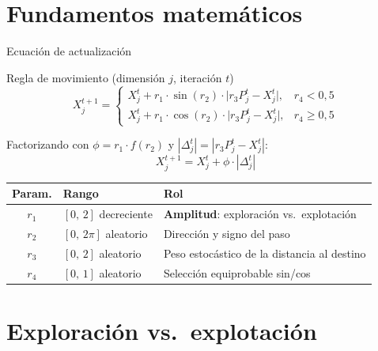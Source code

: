 \documentclass[aspectratio=169]{beamer}
\newcommand{\highlight}[1]{\textcolor{myblue}{\textbf{#1}}}
\begin{document}
\section{Fundamentos matemáticos}

\begin{frame}{Ecuación de actualización}
  \begin{block}{Regla de movimiento (dimensión $j$, iteración $t$)}
    \[
      X_j^{t+1} =
      \begin{cases}
        X_j^t + r_1 \cdot \sin(r_2) \cdot \bigl|r_3 P_j^t - X_j^t\bigr|, & r_4 < 0{,}5 \\[6pt]
        X_j^t + r_1 \cdot \cos(r_2) \cdot \bigl|r_3 P_j^t - X_j^t\bigr|, & r_4 \geq 0{,}5
      \end{cases}
    \]
  \end{block}

  \vspace{0.5em}
  Factorizando con $\phi = r_1 \cdot f(r_2)$ y $|\Delta_j^t| = |r_3 P_j^t - X_j^t|$:
  \[
    \boxed{X_j^{t+1} = X_j^t + \phi \cdot |\Delta_j^t|}
  \]

  \vspace{0.3em}
  \begin{center}
    \small
    \begin{tabular}{c l l}
      \toprule
      \textbf{Param.} & \textbf{Rango} & \textbf{Rol} \\
      \midrule
      $r_1$ & $[0,\,2]$ decreciente & \highlight{Amplitud}: exploración vs.\ explotación \\
      $r_2$ & $[0,\,2\pi]$ aleatorio & Dirección y signo del paso \\
      $r_3$ & $[0,\,2]$ aleatorio & Peso estocástico de la distancia al destino \\
      $r_4$ & $[0,\,1]$ aleatorio & Selección equiprobable sin/cos \\
      \bottomrule
    \end{tabular}
  \end{center}
\end{frame}

\section{Exploración vs.\ explotación}
\end{document}
